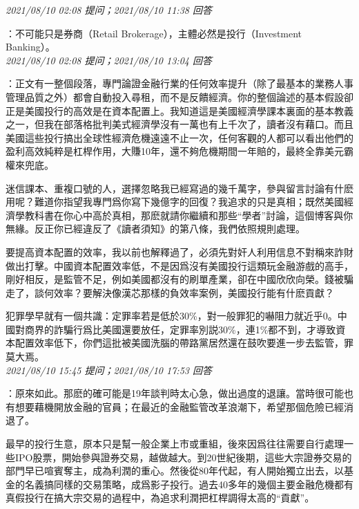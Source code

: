 \documentclass[twocolumn]{ctexart}
\begin{document}
\textit{\hfill\noindent\small 2021/08/10 02:08 提问；2021/08/10 11:38 回答}

：不可能只是券商（Retail Brokerage），主體必然是投行（Investment Banking）。
\\

\textit{\hfill\noindent\small 2021/08/10 02:08 提问；2021/08/10 13:04 回答}

：正文有一整個段落，專門論證金融行業的任何效率提升（除了最基本的業務人事管理品質之外）都會自動投入尋租，而不是反饋經濟。你的整個論述的基本假設卻正是美國投行的高效是在資本配置上。我知道這是美國經濟學課本裏面的基本教義之一，但我在部落格批判美式經濟學沒有一萬也有上千次了，讀者沒有藉口。而且美國這些投行搞出全球性經濟危機遠遠不止一次，任何客觀的人都可以看出他們的盈利高效純粹是杠桿作用，大賺10年，還不夠危機期間一年賠的，最終全靠美元霸權來兜底。

迷信課本、重複口號的人，選擇忽略我已經寫過的幾千萬字，參與留言討論有什麽用呢？難道你指望我專門爲你寫下幾億字的回復？我追求的只是真相；既然美國經濟學教科書在你心中高於真相，那麽就請你繼續和那些“學者”討論，這個博客與你無緣。反正你已經違反了《讀者須知》的第八條，我們依照規則處理。


要提高資本配置的效率，我以前也解釋過了，必須先對奸人利用信息不對稱來詐財做出打擊。中國資本配置效率低，不是因爲沒有美國投行這類玩金融游戲的高手，剛好相反，是監管不足，例如美國都沒有的刷單產業，卻在中國欣欣向榮。錢被騙走了，談何效率？要解決像漢芯那樣的負效率案例，美國投行能有什麽貢獻？

犯罪學早就有一個共識：定罪率若是低於30\%，對一般罪犯的嚇阻力就近乎0。中國對商界的詐騙行爲比美國還要放任，定罪率別説30\%，連1\%都不到，才導致資本配置效率低下，你們這批被美國洗腦的帶路黨居然還在鼓吹要進一步去監管，罪莫大焉。
\\

\textit{\hfill\noindent\small 2021/08/10 15:45 提问；2021/08/10 17:53 回答}

：原來如此。那麽的確可能是19年談判時太心急，做出過度的退讓。當時很可能也有想要藉機開放金融的官員；在最近的金融監管改革浪潮下，希望那個危險已經消退了。

最早的投行生意，原本只是幫一般企業上市或重組，後來因爲往往需要自行處理一些IPO股票，開始參與證券交易，越做越大。到20世紀後期，這些大宗證券交易的部門早已喧賓奪主，成為利潤的重心。然後從80年代起，有人開始獨立出去，以基金的名義搞同樣的交易策略，成爲影子投行。過去40多年的幾個主要金融危機都有真假投行在搞大宗交易的過程中，為追求利潤把杠桿調得太高的“貢獻”。
\end{document}
